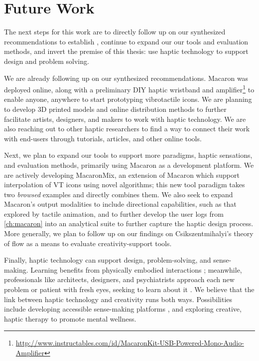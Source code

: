 %
%
\section{Future Work}
The next steps for this work are to directly follow up on our synthesized recommendations to establish \haxd, continue to expand our our tools and evaluation methods, and invert the premise of this thesis: use haptic technology to support design and problem solving.

We are already following up on our synthesized recommendations.
Macaron was deployed online, along with a preliminary DIY haptic wristband and amplifier\footnote{\url{http://www.instructables.com/id/MacaronKit-USB-Powered-Mono-Audio-Amplifier}} to enable anyone, anywhere to start prototyping vibrotactile icons.
We are planning to develop 3D printed models and online distribution methods to further facilitate artists, designers, and makers to work with haptic technology.
We are also reaching out to other haptic researchers to find a way to connect their work with end-users through tutorials, articles, and other online tools.

Next, we plan to expand our tools to support more paradigms, haptic sensations, and evaluation methods, primarily using Macaron as a development platform.
We are actively developing MacaronMix, an extension of Macaron which support interpolation of VT icons using novel algorithms; this new tool paradigm takes two \emph{browsed} examples and directly combines them.
We also seek to expand Macaron's output modalities to include directional capabilities, such as that explored by tactile animation, and to further develop the user logs from \autoref{ch:macaron} into an analytical suite to further capture the haptic design process.
More generally, we plan to follow up on our findings on Csikszentmihalyi's theory of flow \cite{Csikszentmihalyi1996} as a means to evaluate creativity-support tools.


Finally, haptic technology can support design, problem-solving, and sense-making.
Learning benefits from physically embodied interactions \cite{Papert1980}; meanwhile, professionals like architects, designers, and psychiatrists approach each new problem or patient with fresh eyes, seeking to learn about it \cite{Schon1982}.
We believe that the link between haptic technology and creativity runs both ways.
Possibilities include developing accessible sense-making platforms \cite{Swaminathan2016}, and exploring creative, haptic therapy to promote mental wellness.

